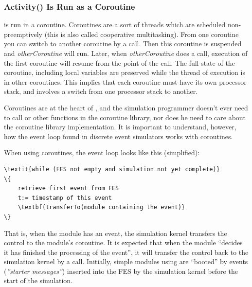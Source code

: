 \subsubsection{Activity() Is Run as a Coroutine}


 is run in a coroutine.
Coroutines are a sort of threads which are scheduled
non-preemptively (this is also called cooperative
multitasking). From one coroutine you
can switch to another coroutine by a
 call. Then this
coroutine is suspended and \textit{otherCoroutine} will run. Later,
when \textit{otherCoroutine} does a
 call, execution of
the first coroutine will resume from the point of the
 call.  The full state
of the coroutine, including local variables are preserved while the
thread of execution is in other coroutines.  This implies that each
coroutine must have its own processor stack, and
 involves a switch from one processor stack to
another.


Coroutines are at the heart of {\opp}, and the
simulation programmer doesn't ever need to call 
or other functions in the coroutine library, nor does he need to care
about the coroutine library implementation. It is important to
understand, however, how the event loop found in discrete event simulators
works with coroutines.


When using coroutines, the event loop looks like
this (simplified):


\begin{Verbatim}[commandchars=\\\{\}]
\textit{while (FES not empty and simulation not yet complete)}
\{
    retrieve first event from FES
    t:= timestamp of this event
    \textbf{transferTo(module containing the event)}
\}
\end{Verbatim}



That is, when the module has an event, the simulation
kernel transfers the control to the module's coroutine. It is expected
that when the module ``decides it has finished the processing of the
event'', it will transfer the control back to the simulation kernel by
a  call. Initially,
simple modules using  are
``booted'' by events (\textit{''starter messages''})
inserted into the FES by the simulation kernel before the
start of the simulation.



